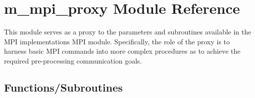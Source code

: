 \hypertarget{namespacem__mpi__proxy}{}\section{m\+\_\+mpi\+\_\+proxy Module Reference}
\label{namespacem__mpi__proxy}


This module serves as a proxy to the parameters and subroutines available in the M\+PI implementation\textquotesingle{}s M\+PI module. Specifically, the role of the proxy is to harness basic M\+PI commands into more complex procedures as to achieve the required pre-\/processing communication goals.  


\subsection*{Functions/\+Subroutines}
